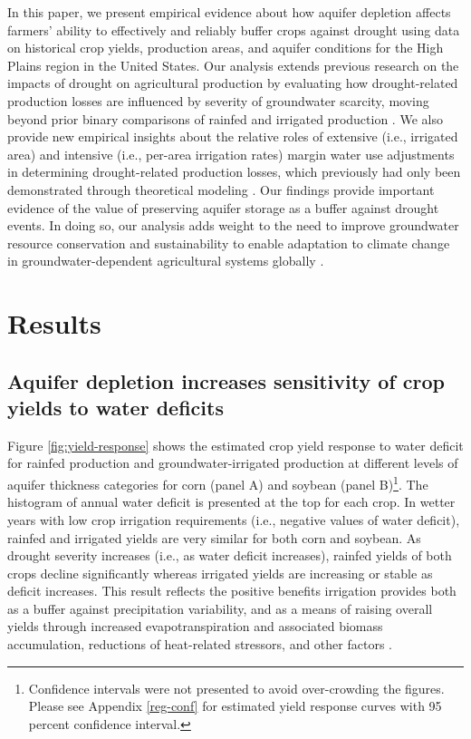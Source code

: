 \documentclass[
]{article}
\begin{document}
In this paper, we present empirical evidence about how aquifer depletion affects farmers' ability to effectively and reliably buffer crops against drought  using data on historical crop yields, production areas, and aquifer conditions for the High Plains region in the United States. Our analysis extends previous research on the impacts of drought on agricultural production by evaluating how drought-related production losses are influenced by severity of groundwater scarcity, moving beyond prior binary comparisons of rainfed and irrigated production \citep{schlenker2009nonlinear, lobell2014greater, lu2018crop}. We also provide new empirical insights about the relative roles of extensive (i.e., irrigated area) and intensive (i.e., per-area irrigation rates) margin water use adjustments in determining drought-related production losses, which previously had only been demonstrated through theoretical modeling \citep{foster2014modeling, foster2017effects, rad2020effects}. Our findings provide important evidence of the value of preserving aquifer storage as a buffer against drought events. In doing so, our analysis adds weight to the need to improve groundwater resource conservation and sustainability to enable adaptation to climate change in groundwater-dependent agricultural systems globally \citep{jain2021groundwater, scanlon2023global}.

\hypertarget{results}{%
\section{Results}\label{results}}

\hypertarget{impact-intensive}{%
\subsection{Aquifer depletion increases sensitivity of crop yields to water deficits}\label{impact-intensive}}

Figure \ref{fig:yield-response} shows the estimated crop yield response to water deficit for rainfed production and groundwater-irrigated production at different levels of aquifer thickness categories for corn (panel A) and soybean (panel B)\footnote{Confidence intervals were not presented to avoid over-crowding the figures. Please see Appendix \ref{reg-conf} for estimated yield response curves with 95 percent confidence interval.}. The histogram of annual water deficit is presented at the top for each crop. In wetter years with low crop irrigation requirements (i.e., negative values of water deficit), rainfed and irrigated yields are very similar for both corn and soybean. As drought severity increases (i.e., as water deficit increases), rainfed yields of both crops decline significantly whereas irrigated yields are increasing or stable as deficit increases. This result reflects the positive benefits irrigation provides both as a buffer against precipitation variability, and as a means of raising overall yields through increased evapotranspiration and associated biomass accumulation, reductions of heat-related stressors, and other factors \citep{zhu2022untangling, li2020quantifying}.
\end{document}
